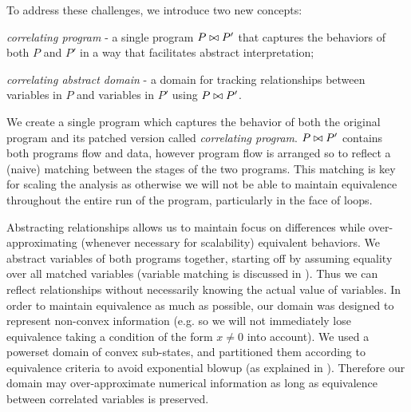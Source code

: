 To address these challenges, we introduce two new concepts:
\begin{inparaenum}[(i)]
\item \emph{correlating program} - a single program $P \bowtie P'$ that captures the behaviors of both $P$ and $P'$ in a way that facilitates abstract interpretation;
\item \emph{correlating abstract domain} - a domain for tracking relationships between variables in $P$ and variables in $P'$ using $P \bowtie P'$.
\end{inparaenum}

We create a single program which captures the behavior of both the original program and its patched version called \emph{correlating program}. $P \bowtie P'$ contains both programs flow and data, however program flow is arranged so to reflect a (naive) matching between the stages of the two programs. This matching is key for scaling the analysis as otherwise we will not be able to maintain equivalence throughout the entire run of the program, particularly in the face of loops.

Abstracting relationships allows us to maintain focus on differences while over-approximating (whenever necessary for scalability) equivalent behaviors. We abstract variables of both programs together, starting off by assuming equality over all matched variables (variable matching is discussed in \secref{}). Thus we can
reflect relationships without necessarily knowing the actual value of
variables. In order to maintain equivalence as much as possible, our domain was designed to represent non-convex information (e.g. so we will not immediately lose equivalence taking a condition of the form $x \neq 0$ into account). We used a powerset domain of convex sub-states, and partitioned them according to equivalence criteria to avoid exponential blowup (as explained in \secref{}). Therefore our domain may over-approximate numerical information as long as equivalence between correlated variables is preserved.

